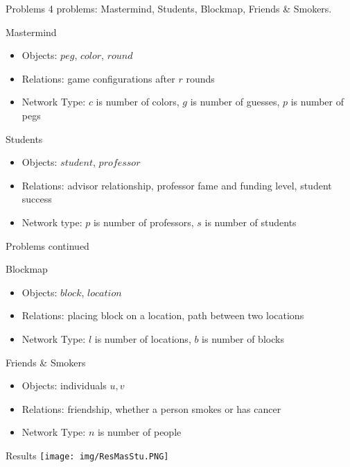 \documentclass[xcolor={table}]{beamer}
\begin{document}
\begin{frame}{Problems}
4 problems: Mastermind, Students, Blockmap, Friends \& Smokers.
\begin{block}{Mastermind}
\begin{itemize}
\item Objects: $peg$, $color$, $round$
\item Relations: game configurations after $r$ rounds
\item Network Type: $c$ is number of colors, $g$ is number of guesses, $p$ is number of pegs
\end{itemize}
\end{block}

\begin{block}{Students}
\begin{itemize}
\item Objects: $student$, $professor$
\item Relations: advisor relationship, professor fame and funding level, student success
\item Network type: $p$ is number of professors, $s$ is number of students
\end{itemize}
\end{block}
\end{frame}


\begin{frame}{Problems continued}
\begin{block}{Blockmap}
\begin{itemize}
\item Objects: $block$, $location$
\item Relations: placing block on a location, path between two locations
\item Network Type: $l$ is number of locations, $b$ is number of blocks
\end{itemize}
\end{block}
\begin{block}{Friends \& Smokers}
\begin{itemize}
\item Objects: individuals $u,v$
\item Relations: friendship, whether a person smokes or has cancer
\item Network Type: $n$ is number of people
\end{itemize}
\end{block}
\end{frame}

\begin{frame}{Results}
\texttt{[image: img/ResMasStu.PNG]}
\end{frame}
\end{document}

